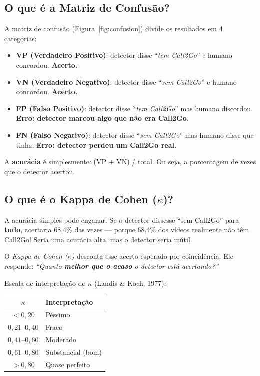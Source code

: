 \documentclass[12pt,a4paper]{article}
\newcommand{\ok}[1]{\textcolor{verde}{\textbf{#1}}}
\newcommand{\alerta}[1]{\textcolor{laranja}{\textbf{#1}}}
\newcommand{\term}[1]{\textcolor{roxo}{\textit{#1}}}
\begin{document}
\subsection{O que é a Matriz de Confusão?}

A matriz de confusão (Figura~\ref{fig:confusion}) divide os resultados em 4
categorias:

\begin{itemize}
  \item \textbf{VP (Verdadeiro Positivo)}: detector disse
        ``\textit{tem Call2Go}'' e humano concordou. \ok{Acerto.}
  \item \textbf{VN (Verdadeiro Negativo)}: detector disse
        ``\textit{sem Call2Go}'' e humano concordou. \ok{Acerto.}
  \item \textbf{FP (Falso Positivo)}: detector disse
        ``\textit{tem Call2Go}'' mas humano discordou.
        \alerta{Erro: detector marcou algo que não era Call2Go.}
  \item \textbf{FN (Falso Negativo)}: detector disse
        ``\textit{sem Call2Go}'' mas humano disse que tinha.
        \alerta{Erro: detector perdeu um Call2Go real.}
\end{itemize}

A \textbf{acurácia} é simplesmente: (VP + VN) / total. Ou seja, a
porcentagem de vezes que o detector acertou.

\subsection{O que é o Kappa de Cohen ($\kappa$)?}

A acurácia simples pode enganar. Se o detector dissesse ``sem Call2Go'' para
\textbf{tudo}, acertaria 68,4\% das vezes --- porque 68,4\% dos vídeos
realmente não têm Call2Go! Seria uma acurácia alta, mas o detector seria
inútil.

O \term{Kappa de Cohen ($\kappa$)} desconta esse acerto esperado por
coincidência. Ele responde: \textit{``Quanto \textbf{melhor que o acaso} o
detector está acertando?''}

Escala de interpretação do $\kappa$ (Landis \& Koch, 1977):

\medskip
\begin{center}
\begin{tabular}{cl}
\toprule
$\kappa$ & Interpretação \\
\midrule
$< 0{,}20$        & Péssimo \\
$0{,}21$--$0{,}40$ & Fraco \\
$0{,}41$--$0{,}60$ & Moderado \\
$0{,}61$--$0{,}80$ & Substancial (bom) \\
$> 0{,}80$        & Quase perfeito \\
\bottomrule
\end{tabular}
\end{center}
\medskip
\end{document}
